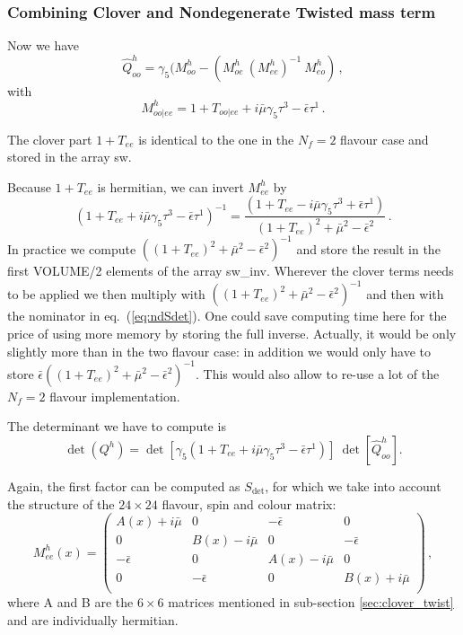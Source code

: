\subsubsection{Combining Clover and Nondegenerate Twisted mass term}

Now we have
\[
\hat Q^h_{oo} = \gamma_5(M_{oo}^h -
(M_{oe}^h\ (M_{ee}^h)^{-1}\ M_{eo}^h)\,,
\]
with
\begin{equation}
  M_{oo|ee}^h = 1+T_{oo|ee}+i\bar\mu\gamma_5\tau^3-\bar\epsilon\tau^1\,.
\end{equation}

The clover part $1+T_{ee}$ is identical to the one in the $N_f=2$
flavour case and stored in the array {\ttfamily sw}. 

Because $1+T_{ee}$ is hermitian, we can invert $M_{ee}^h$ by
\begin{equation}
  \label{eq:ndSdet}
  (1+T_{ee}+i\bar\mu\gamma_5\tau^3-\bar\epsilon\tau^1)^{-1} =
  \frac{(1+T_{ee}-i\bar\mu\gamma_5\tau^3+\bar\epsilon\tau^1)}
  {(1+T_{ee})^2 + \bar\mu^2 - \bar\epsilon^2}\,.
\end{equation}
In practice we compute $((1+T_{ee})^2 + \bar\mu^2 -
\bar\epsilon^2)^{-1}$ and store the result in the first {\ttfamily
  VOLUME/2} elements of the array {\ttfamily sw\_inv}. Wherever the
clover terms needs to be applied we then multiply with  $((1+T_{ee})^2
+ \bar\mu^2 - \bar\epsilon^2)^{-1}$ and then with the nominator in
eq.~(\ref{eq:ndSdet}). One could save computing time here for the
price of using more memory by storing the full inverse. Actually, it
would be only slightly more than in the two flavour case: in addition
we would only have to store $\bar\epsilon((1+T_{ee})^2
+ \bar\mu^2 - \bar\epsilon^2)^{-1}$. This would also allow to re-use a
lot of the $N_f=2$ flavour implementation.

The determinant we have to compute is
\[
\det(Q^h) =
\det[\gamma_5(1+T_{ee}+i\bar\mu\gamma_5\tau^3-\bar\epsilon\tau^1)]\
\det[\hat Q^h_{oo}].
\]

Again, the first factor can be computed as $S_\mathrm{det}$, for which we take into
account the structure of the $24 \times 24$ flavour, spin and colour matrix:
\begin{equation}
	\label{eq:cloverMee_eps}
	M^h_{ee}(x) = 
		\begin{pmatrix}
		  A(x) + i\bar{\mu} & 0 & -\bar{\epsilon} & 0 \\
		  0 & B(x) - i\bar{\mu} & 0 & -\bar{\epsilon} \\
		  -\bar{\epsilon} & 0 & A(x) - i\bar{\mu} & 0 \\
		  0 & -\bar{\epsilon} & 0 & B(x) + i\bar{\mu} \\
		\end{pmatrix}\, ,
\end{equation}
where A and B are the $6 \times 6$ matrices mentioned in sub-section 
\ref{sec:clover_twist} and are individually hermitian. 

